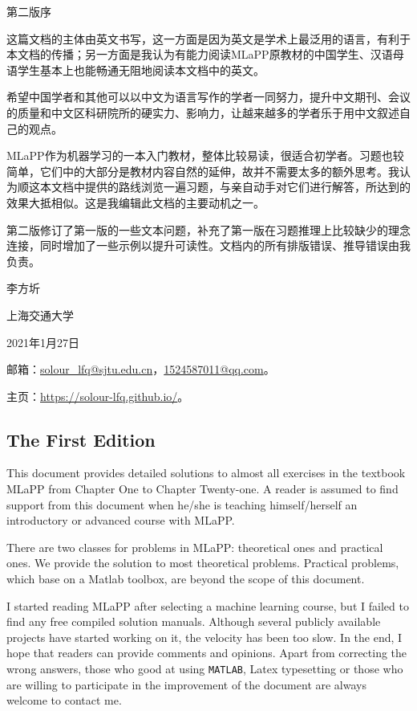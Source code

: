 \documentclass[UTF8]{ctexart}
\begin{document}
\newpage
\centerline{\Large{第二版序}}

这篇文档的主体由英文书写，这一方面是因为英文是学术上最泛用的语言，有利于本文档的传播；另一方面是我认为有能力阅读MLaPP原教材的中国学生、汉语母语学生基本上也能畅通无阻地阅读本文档中的英文。

希望中国学者和其他可以以中文为语言写作的学者一同努力，提升中文期刊、会议的质量和中文区科研院所的硬实力、影响力，让越来越多的学者乐于用中文叙述自己的观点。

MLaPP作为机器学习的一本入门教材，整体比较易读，很适合初学者。习题也较简单，它们中的大部分是教材内容自然的延伸，故并不需要太多的额外思考。我认为顺这本文档中提供的路线浏览一遍习题，与亲自动手对它们进行解答，所达到的效果大抵相似。这是我编辑此文档的主要动机之一。

第二版修订了第一版的一些文本问题，补充了第一版在习题推理上比较缺少的理念连接，同时增加了一些示例以提升可读性。文档内的所有排版错误、推导错误由我负责。

李方圻

上海交通大学

2021年1月27日

邮箱：\url{solour_lfq@sjtu.edu.cn}，\url{1524587011@qq.com}。

主页：\url{https://solour-lfq.github.io/}。

\newpage
\subsection{The First Edition}
This document provides detailed solutions to almost all exercises in the textbook MLaPP from Chapter One to Chapter Twenty-one.
A reader is assumed to find support from this document when he/she is teaching himself/herself an introductory or advanced course with MLaPP.

There are two classes for problems in MLaPP: theoretical ones and practical ones.
We provide the solution to most theoretical problems.
Practical problems, which base on a Matlab toolbox, are beyond the scope of this document.

I started reading MLaPP after selecting a machine learning course, but I failed to find any free compiled solution manuals.
Although several publicly available projects have started working on it, the velocity has been too slow.
In the end, I hope that readers can provide comments and opinions. Apart from correcting the wrong answers, those who good at using \texttt{MATLAB}, Latex typesetting or those who are willing to participate in the improvement of the document are always welcome to contact me.
\end{document}
